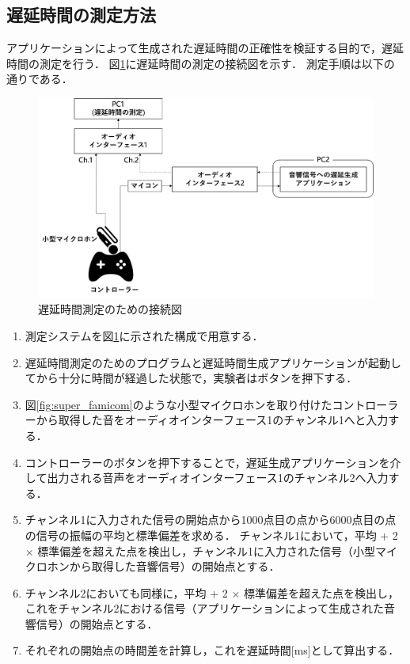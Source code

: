 \subsection{遅延時間の測定方法}
アプリケーションによって生成された遅延時間の正確性を検証する目的で，遅延時間の測定を行う．
図\ref{fig:delay_check}に遅延時間の測定の接続図を示す．
測定手順は以下の通りである．
\begin{figure}[tb]
  \centering
  \includegraphics[scale=0.1]{figures/DelayCheck/DelayCheck_EX.pdf}
  \caption{遅延時間測定のための接続図}
  \label{fig:delay_check}
\end{figure}
\begin{enumerate}[leftmargin=*]
  \item 測定システムを図\ref{fig:delay_check}に示された構成で用意する．
  \item 遅延時間測定のためのプログラムと遅延時間生成アプリケーションが起動してから十分に時間が経過した状態で，実験者はボタンを押下する．
  \item 図\ref{fig:super_famicom}のような小型マイクロホンを取り付けたコントローラーから取得した音をオーディオインターフェース1のチャンネル1へと入力する．
  \item コントローラーのボタンを押下することで，遅延生成アプリケーションを介して出力される音声をオーディオインターフェース1のチャンネル2へ入力する．
  \item チャンネル1に入力された信号の開始点から1000点目の点から6000点目の点の信号の振幅の平均と標準偏差を求める．
  チャンネル1において，平均 + 2 × 標準偏差を超えた点を検出し，チャンネル1に入力された信号（小型マイクロホンから取得した音響信号）の開始点とする．
  \item チャンネル2においても同様に，平均 + 2 × 標準偏差を超えた点を検出し，
  これをチャンネル2における信号（アプリケーションによって生成された音響信号）の開始点とする．
  \item それぞれの開始点の時間差を計算し，これを遅延時間[ms]として算出する．
\end{enumerate}
